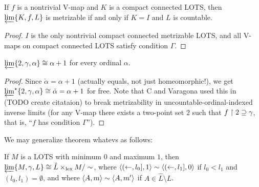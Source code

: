\documentclass[11pt]{article}
\newcommand{\lexTimes}{\times_{\textrm{lex}}}
\begin{document}
  \begin{corollary}
    If \(f\) is a nontrivial V-map
    and \(K\) is a compact connected LOTS, then
    \(\varprojlim \{K, f, L\}\) is metrizable if and only if
    \(K=I\) and \(L\) is countable.
  \end{corollary}

  \begin{proof}
    \(I\) is the only nontrivial compact connected metrizable LOTS, and all V-maps
    on compact connected LOTS satisfy condition \(\Gamma\).
  \end{proof}

  \begin{corollary}
    \(
      \varprojlim \{2, \gamma, \alpha\}
      \cong
      \alpha+1
    \)
    for every ordinal \(\alpha\).
  \end{corollary}

  \begin{proof}
    Since \(\check\alpha=\alpha+1\) (actually equals, not just homeomorphic!),
    we get \(\varprojlim^\star \{2, \gamma, \alpha\}
      \cong \check\alpha =
    \alpha+1\) for free.
    Note that C and Varagona used this in (TODO create citataion) to break
    metrizability in uncountable-ordinal-indexed inverse limits (for any V-map
    there exists a two-point set \(2\) such that \(f\restriction 2\supseteq\gamma\),
    that is, ``\(f\) has condition \(\Gamma\)'').
  \end{proof}

  \bigskip

  We may generalize theorem whatevs as follows:

  \begin{theorem} %
    If \(M\) is a LOTS with minimum \(0\) and maximum \(1\),
    then \(\varprojlim\{M,\gamma,L\}\cong \hat L\lexTimes M/\sim\),
    where \(\langle(\leftarrow,l_0],1\rangle\sim\langle(\leftarrow,l_1],0\rangle\) if
    \(l_0<l_1\) and \((l_0,l_1)=\emptyset\),
    and where \(\langle A,m\rangle\sim\langle A,m'\rangle\) if \(A\in\hat L\setminus L\).
  \end{theorem}
\end{document}

